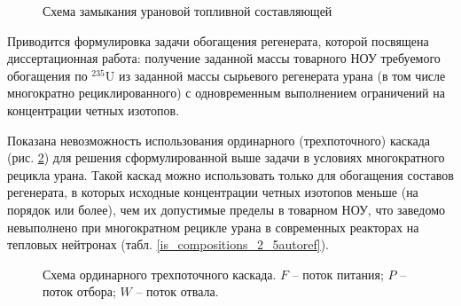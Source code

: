 \begin{figure}[ht]
  \caption{Схема замыкания урановой топливной составляющей}\label{fig_autoref2}
\end{figure}

Приводится формулировка задачи обогащения регенерата, которой посвящена диссертационная работа: получение заданной массы товарного НОУ требуемого обогащения по $^{235}$U из заданной массы сырьевого регенерата урана (в том числе многократно рециклированного) с одновременным выполнением ограничений на концентрации четных изотопов. 

Показана невозможность использования ординарного (трехпоточного) каскада (рис. \ref{ordinary}) для решения сформулированной выше задачи в условиях многократного рецикла урана. Такой каскад можно использовать только для обогащения составов регенерата, в которых исходные концентрации четных изотопов меньше (на порядок или более), чем их допустимые пределы в товарном НОУ, что заведомо невыполнено при многократном рецикле урана в современных реакторах на тепловых нейтронах (табл. \ref{is_compositions_2_5autoref}).

\begin{figure}[ht]
  \caption{Схема ординарного трехпоточного каскада. $F$ -- поток питания; $P$ -- поток отбора; $W$ -- поток отвала.}\label{ordinary}
\end{figure}

